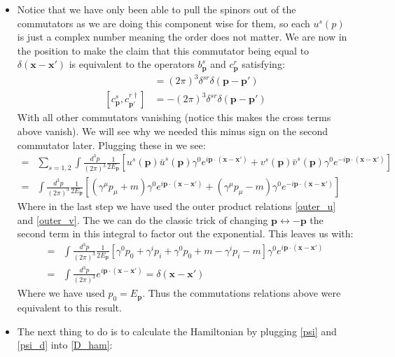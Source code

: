 \documentclass[11pt]{article}
\numberwithin{equation}{section}
\begin{document}
    \begin{itemize}
      \item Notice that we have only been able to pull the spinors out of the commutators as we are doing this component wise for them, so each $u^s(p)$ is just a complex number meaning the order does not matter. We are now in the position to make the claim that this commutator being equal to $\delta(\textbf{x}-\textbf{x}')$ is equivalent to the operators $b^s_{\textbf{p}}$ and $c^r_{\textbf{p}}$ satisfying: 
      \begin{align*}
      [b^{s}_{\textbf{p}},b^{r \dagger}_{\textbf{p}'}] &= (2\pi)^3\delta^{sr}\delta(\textbf{p}-\textbf{p}') \\
      [c^{s}_{\textbf{p}},c^{r \dagger}_{\textbf{p}'}] &= -(2\pi)^3\delta^{sr}\delta(\textbf{p}-\textbf{p}')
      \end{align*}
      With all other commutators vanishing (notice this makes the cross terms above vanish). We will see why we needed this minus sign on the second commutator later. Plugging these in we see: 
      \begin{align*}
      [\psi(\textbf{x}),\psi^{\dagger}(\textbf{x}')] =&  \sum_{s=1,2}\int \frac{d^3p}{(2\pi)^3}\frac{1}{2E_{\textbf{p}}}\left[u^s(\textbf{p})\bar{u}^{s}(\textbf{p})\gamma^{0}e^{i\textbf{p}\cdot(\textbf{x}-\textbf{x}')}+v^s(\textbf{p})\bar{v}^{s}(\textbf{p})\gamma^{0}e^{-i\textbf{p}\cdot(\textbf{x}-\textbf{x}')}\right] \\
       =&  \int \frac{d^3p}{(2\pi)^3}\frac{1}{2E_{\textbf{p}}} \left[(\gamma^{\mu}p_{\mu}+m)\gamma^{0}e^{i\textbf{p}\cdot(\textbf{x}-\textbf{x}')}+(\gamma^{\mu}p_{\mu}-m)\gamma^{0}e^{-i\textbf{p}\cdot(\textbf{x}-\textbf{x}')}\right]
      \end{align*}
      Where in the last step we have used the outer product relations \ref{outer_u} and \ref{outer_v}. The we can do the classic trick of changing $\textbf{p}\leftrightarrow -\textbf{p}$ the second term in this integral to factor out the exponential. This leaves us with: 
      \begin{align*}
      [\psi(\textbf{x}),\psi^{\dagger}(\textbf{x}')] =& \int \frac{d^3p}{(2\pi)^3}\frac{1}{2E_{\textbf{p}}}[\gamma^{0}p_0+\gamma^{i}p_{i}+\gamma^{0}p_{0}+m-\gamma^{i}p_{i}-m]\gamma^{0} e^{i\textbf{p}\cdot(\textbf{x}-\textbf{x}')} \\ 
      = & \int \frac{d^3p}{(2\pi)^3}e^{i\textbf{p}\cdot(\textbf{x}-\textbf{x}')} = \delta(\textbf{x}-\textbf{x}')
      \end{align*}
      Where we have used $p_0 = E_{\textbf{p}}$. Thus the commutations relations above were equivalent to this result. 

      \item The next thing to do is to calculate the Hamiltonian by plugging \ref{psi} and \ref{psi_d} into \ref{D_ham}:
          \end{itemize}
\end{document}
